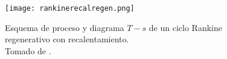 \begin{figure}[H]
  \begin{center}
    \texttt{[image: rankinerecalregen.png]}
  \end{center}
  \caption{Esquema de proceso y diagrama $T-s$ de un ciclo Rankine regenerativo con recalentamiento. \\Tomado de \textcite{ccengel2006termodinamica}.}
  \label{fig:recalreg}
\end{figure}

\pagebreak
